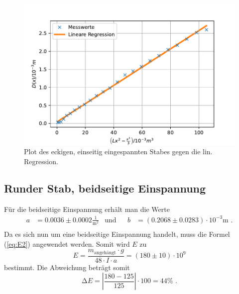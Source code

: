 \begin{figure}[H]
  \centering
  \includegraphics{pictures/Lineare Regression2.pdf}
  \caption{Plot des eckigen, einseitig eingespannten Stabes gegen die lin. Regression.}
  \label{fig:plot2}
\end{figure}


\subsection{Runder Stab, beidseitige Einspannung}

Für die beidseitige Einspannung erhält man die Werte
\begin{align*}
  a &= 0.0036 ± 0.0002 \frac{1}{\unit{\meter\squared}} & \text{und}& & b&= (0.2068 ± 0.0283) \cdot 10^{-3} \unit\meter \text{ .} \\
\end{align*}
Da es sich nun um eine beidseitige Einspannung handelt, muss die Formel (\ref{eq:E2}) angewendet werden.
Somit wird $E$ zu
\begin{equation*}
  E = \frac{m_\text{angehängt} \cdot g}{48 \cdot I \cdot a} = (180 \pm 10) \cdot 10^{9}
\end{equation*}
bestimmt. Die Abweichung beträgt somit
\begin{equation*}
  \increment E = \left|\frac{180 - 125}{125}\right| \cdot 100 = 44 \% \text{ .}
\end{equation*}

